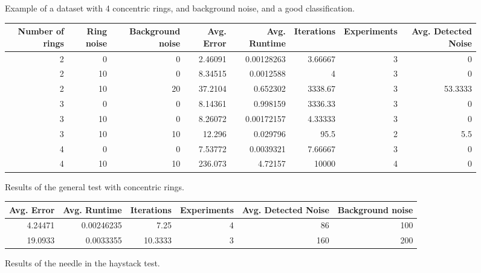 \documentclass[conference]{IEEEtran}
\begin{document}
\begin{figure}[t]
    \centering
    \resizebox{0.9\linewidth}{!}{}
    \label{fig:concentric_rings}
    \caption{Example of a dataset with 4 concentric rings, and background noise, and a good classification.}
\end{figure}

\begin{figure*}[!ht]
\centering
\begin{tabular}{rrrrrrrr}
    \hline
       Number of rings &   Ring noise &   Background noise &   Avg. Error &   Avg. Runtime &   Iterations &   Experiments &   Avg. Detected Noise \\
    \hline
                     2 &            0 &                  0 &      2.46091 &     0.00128263 &      3.66667 &             3 &                0      \\
                     2 &           10 &                  0 &      8.34515 &     0.0012588  &      4       &             3 &                0      \\
                     2 &           10 &                 20 &     37.2104  &     0.652302   &   3338.67    &             3 &               53.3333 \\
                     3 &            0 &                  0 &      8.14361 &     0.998159   &   3336.33    &             3 &                0      \\
                     3 &           10 &                  0 &      8.26072 &     0.00172157 &      4.33333 &             3 &                0      \\
                     3 &           10 &                 10 &     12.296   &     0.029796   &     95.5     &             2 &                5.5    \\
                     4 &            0 &                  0 &      7.53772 &     0.0039321  &      7.66667 &             3 &                0      \\
                     4 &           10 &                 10 &    236.073   &     4.72157    &  10000       &             4 &                0      \\
    \hline
    \end{tabular}
\caption{Results of the general test with concentric rings.}
\end{figure*}
\begin{figure*}[!ht]
    \centering
    \begin{tabular}{rrrrrr}
        \hline
           Avg. Error &   Avg. Runtime &   Iterations &   Experiments &   Avg. Detected Noise &   Background noise \\
        \hline
              4.24471 &     0.00246235 &       7.25   &             4 &                    86 &                100 \\
             19.0933  &     0.0033355  &      10.3333 &             3 &                   160 &                200 \\
        \hline
    \end{tabular}
    \caption{Results of the needle in the haystack test.}
\end{figure*}
\end{document}
